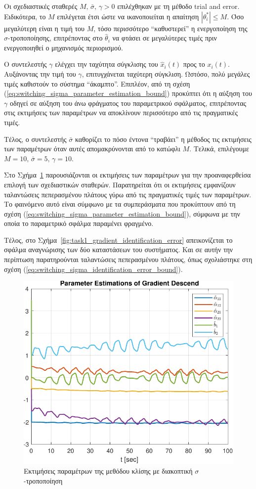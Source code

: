 \documentclass[a4paper,12pt]{article}
\begin{document}
Οι σχεδιαστικές σταθερές $M, \, \bar{\sigma}, \, \gamma > 0$ επιλέχθηκαν με τη μέθοδο 
trial and error. Ειδικότερα, το $M$ επιλέγεται έτσι ώστε 
να ικανοποιείται η απαίτηση $|\theta_i^*| \leq M$. Όσο μεγαλύτερη είναι η τιμή του $M$, τόσο περισσότερο 
``καθυστερεί'' η ενεργοποίηση της $\sigma$-τροποποίησης, επιτρέποντας στο $\hat{\theta}_i$ να φτάσει σε 
μεγαλύτερες τιμές πριν ενεργοποιηθεί ο μηχανισμός περιορισμού. 

Ο συντελεστής $\gamma$ ελέγχει την ταχύτητα σύγκλισης του $\hat{x}_i(t)$ προς το $x_i(t)$. Αυξάνοντας την τιμή 
του $\gamma$, επιτυγχάνεται ταχύτερη σύγκλιση. Ωστόσο, πολύ μεγάλες τιμές καθιστούν το σύστημα ``άκαμπτο''. 
Επιπλέον, από τη σχέση (\ref{eq:switching_sigma_parameter_estimation_bound}) προκύπτει ότι η αύξηση του 
$\gamma$ οδηγεί σε αύξηση του άνω φράγματος του παραμετρικού σφάλματος, επιτρέποντας στις εκτιμήσεις των 
παραμέτρων να αποκλίνουν περισσότερο από τις πραγματικές τιμές.

Τέλος, ο συντελεστής $\bar{\sigma}$ καθορίζει το πόσο έντονα ``τραβάει'' η μέθοδος τις εκτιμήσεις των 
παραμέτρων όταν αυτές απομακρύνονται από το κατώφλι $M$. Τελικά, επιλέγουμε 
$M = 10, \, \bar{\sigma} = 5, \, \gamma = 10$.

Στο Σχήμα~\ref{fig:task1_gradient_parameter_estimations} παρουσιάζονται οι εκτιμήσεις των παραμέτρων για την 
προαναφερθείσα επιλογή των σχεδιαστικών σταθερών. Παρατηρείται ότι οι εκτιμήσεις εμφανίζουν ταλαντώσεις 
πεπερασμένου πλάτους γύρω από τις πραγματικές τιμές των παραμέτρων. Το φαινόμενο αυτό είναι σύμφωνο με τα 
συμπεράσματα που προκύπτουν από τη σχέση (\ref{eq:switching_sigma_parameter_estimation_bound}), σύμφωνα με την 
οποία το παραμετρικό σφάλμα παραμένει φραγμένο.

Τέλος, στο Σχήμα~\ref{fig:task1_gradient_identification_error} απεικονίζεται το σφάλμα αναγνώρισης των δύο 
καταστάσεων του συστήματος. Και σε αυτήν την περίπτωση παρατηρούνται ταλαντώσεις πεπερασμένου πλάτους, όπως 
σχολιάστηκε στη σχέση (\ref{eq:switching_sigma_identification_error_bound}).

\begin{figure}
    \centering
    \includegraphics[width=0.5\linewidth]{plot/task1_gradient_parameter_estimations.pdf}
    \caption{Εκτιμήσεις παραμέτρων της μεθόδου κλίσης με διακοπτική $\sigma$-τροποποίηση}
    \label{fig:task1_gradient_parameter_estimations}
\end{figure}
\end{document}
